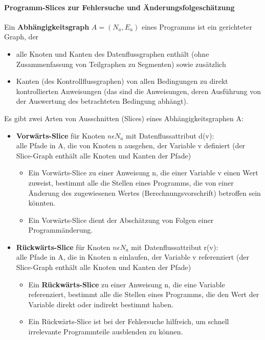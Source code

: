 \paragraph{Programm-Slices zur Fehlersuche und Änderungsfolgeschätzung}
Ein \textbf{Abhängigkeitsgraph} $A = (N_{a}, E_{a})$ eines Programms ist ein gerichteter Graph, der
\begin{itemize}
	\item alle Knoten und Kanten des Datenflussgraphen enthält (ohne Zusammenfassung von Teilgraphen zu Segmenten) sowie zusätzlich
	\item Kanten (des Kontrollflussgraphen) von allen Bedingungen zu direkt kontrollierten Anweisungen (das sind die Anweisungen, deren Ausführung von der Auswertung des betrachteten Bedingung abhängt).
\end{itemize}
Es gibt zwei Arten von Ausschnitten (Slices) eines Abhängigkeitsgraphen A:
\begin{itemize}
	\item \textbf{Vorwärts-Slice} für Knoten $n \epsilon N_{a}$ mit Datenflussattribut d(v): \\
	alle Pfade in A, die von Knoten n ausgehen, der Variable v definiert (der Slice-Graph enthält alle Knoten und Kanten der Pfade)
	\begin{itemize}
		\item Ein Vorwärts-Slice zu einer Anweisung n, die einer Variable v einen Wert zuweist, bestimmt alle die Stellen eines Programms, die von einer Änderung des zugewiesenen Wertes (Berechnungsvorschrift) betroffen sein könnten.
		\item Ein Vorwärts-Slice dient der Abschätzung von Folgen einer Programmänderung.
	\end{itemize}
	\item \textbf{Rückwärts-Slice} für Knoten $n \epsilon N_{a}$ mit Datenflussattribut r(v): \\
	alle Pfade in A, die in Knoten n einlaufen, der Variable v referenziert (der Slice-Graph enthält alle Knoten und Kanten der Pfade)
	\begin{itemize}
		\item Ein \textbf{Rückwärts-Slice} zu einer Anweisung n, die eine Variable referenziert, bestimmt alle die Stellen eines Programms, die den Wert der Variable direkt oder indirekt bestimmt haben.
		\item Ein Rückwärts-Slice ist bei der Fehlersuche hilfreich, um schnell irrelevante Programmteile ausblenden zu können.
	\end{itemize}
\end{itemize}

